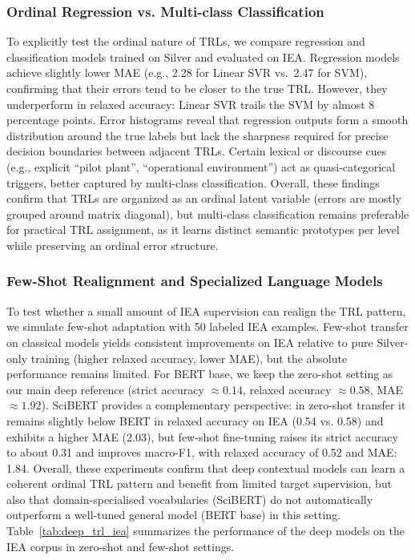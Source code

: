 \documentclass[runningheads]{llncs}
\begin{document}
\subsubsection{Ordinal Regression vs. Multi-class Classification}

To explicitly test the ordinal nature of TRLs, we compare regression and
classification models trained on Silver and evaluated on IEA.
Regression models achieve slightly lower MAE (e.g., 2.28 for Linear SVR vs.\ 2.47
for SVM), confirming that their errors tend to be closer to the true TRL. However, they underperform in relaxed accuracy: Linear SVR trails the
SVM by almost 8 percentage points. Error histograms reveal that regression
outputs form a smooth distribution around the true labels but lack the sharpness
required for precise decision boundaries between adjacent TRLs. Certain lexical
or discourse cues (e.g., explicit ``pilot plant'', ``operational environment'')
act as quasi-categorical triggers, better captured by multi-class
classification.
Overall, these findings confirm that TRLs are organized as an ordinal latent
variable (errors are mostly grouped around matrix diagonal), but
multi-class classification remains preferable for practical TRL assignment, as
it learns distinct semantic prototypes per level while preserving an ordinal
error structure.


\subsubsection{Few-Shot Realignment and Specialized Language Models}

To test whether a small amount of IEA supervision can realign the TRL pattern, we simulate few-shot adaptation with 50 %
labeled IEA examples. Few-shot transfer on classical models yields consistent improvements on IEA relative to pure Silver-only training (higher relaxed accuracy, lower MAE), but the absolute performance remains limited. For BERT base, we keep the zero-shot setting as our main deep reference (strict accuracy $\approx 0.14$, relaxed accuracy $\approx 0.58$, MAE $\approx 1.92$). SciBERT provides a complementary perspective: in zero-shot transfer it remains slightly below BERT in relaxed accuracy on IEA (0.54 vs. 0.58) and exhibits a higher MAE (2.03), but few-shot fine-tuning raises its strict accuracy to about 0.31 and improves macro-F1, with relaxed accuracy of 0.52 and MAE: 1.84. Overall, these experiments confirm that deep contextual models can learn a coherent ordinal TRL pattern and benefit from limited target supervision, but also that domain-specialised vocabularies (SciBERT) do not automatically outperform a well-tuned general model (BERT base) in this setting.
Table~\ref{tab:deep_trl_iea} summarizes the performance of the deep models on the IEA corpus in zero-shot and few-shot settings.
\end{document}

